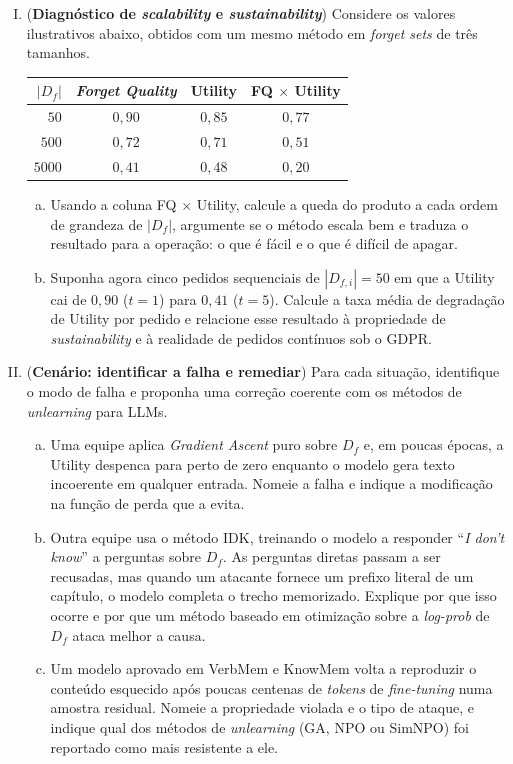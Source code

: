 \documentclass{dlproblemset}
\begin{document}
\begin{enumerate}[I)]
    \item (\textbf{Diagnóstico de \textit{scalability} e \textit{sustainability}}) Considere os valores ilustrativos abaixo, obtidos com um mesmo método em \textit{forget sets} de três tamanhos.

    \begin{center}
    \begin{tabular}{@{}rccc@{}}
        \toprule
        $|D_f|$ & \textit{Forget Quality} & Utility & FQ $\times$ Utility \\
        \midrule
        $50$   & $0{,}90$ & $0{,}85$ & $0{,}77$ \\
        $500$  & $0{,}72$ & $0{,}71$ & $0{,}51$ \\
        $5000$ & $0{,}41$ & $0{,}48$ & $0{,}20$ \\
        \bottomrule
    \end{tabular}
    \end{center}

    \begin{enumerate}[(a)]
        \item Usando a coluna FQ $\times$ Utility, calcule a queda do produto a cada ordem de grandeza de $|D_f|$, argumente se o método escala bem e traduza o resultado para a operação: o que é fácil e o que é difícil de apagar.
        \item Suponha agora cinco pedidos sequenciais de $|D_{f,i}| = 50$ em que a Utility cai de $0{,}90$ ($t=1$) para $0{,}41$ ($t=5$). Calcule a taxa média de degradação de Utility por pedido e relacione esse resultado à propriedade de \textit{sustainability} e à realidade de pedidos contínuos sob o GDPR.
    \end{enumerate}

    \item (\textbf{Cenário: identificar a falha e remediar}) Para cada situação, identifique o modo de falha e proponha uma correção coerente com os métodos de \textit{unlearning} para LLMs.
    \begin{enumerate}[(a)]
        \item Uma equipe aplica \textit{Gradient Ascent} puro sobre $D_f$ e, em poucas épocas, a Utility despenca para perto de zero enquanto o modelo gera texto incoerente em qualquer entrada. Nomeie a falha e indique a modificação na função de perda que a evita.
        \item Outra equipe usa o método IDK, treinando o modelo a responder ``\textit{I don't know}'' a perguntas sobre $D_f$. As perguntas diretas passam a ser recusadas, mas quando um atacante fornece um prefixo literal de um capítulo, o modelo completa o trecho memorizado. Explique por que isso ocorre e por que um método baseado em otimização sobre a \textit{log-prob} de $D_f$ ataca melhor a causa.
        \item Um modelo aprovado em VerbMem e KnowMem volta a reproduzir o conteúdo esquecido após poucas centenas de \textit{tokens} de \textit{fine-tuning} numa amostra residual. Nomeie a propriedade violada e o tipo de ataque, e indique qual dos métodos de \textit{unlearning} (GA, NPO ou SimNPO) foi reportado como mais resistente a ele.
    \end{enumerate}


\end{enumerate}
\end{document}
